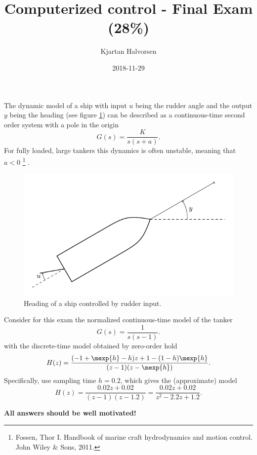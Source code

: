 \documentclass[a4paper]{scrartcl}
\author{Kjartan Halvorsen}
\date{2018-11-29}
\title{Computerized control - Final Exam (28\%)}
\begin{document}
\maketitle
The dynamic model of a ship with input $u$ being the rudder angle and the output $y$ being the heading (see figure \ref{fig:tanker}) can be described as a continuous-time second order system with a pole in the origin
\[ G(s) = \frac{K}{s(s + a)}. \]
For fully loaded, large tankers this dynamics is often unstable, meaning that $a<0$ \footnote{Fossen, Thor I. Handbook of marine craft hydrodynamics and motion control. John Wiley \& Sons, 2011.} .  
\begin{figure}[h]
\begin{center}
\includegraphics[]{tanker}
\caption{Heading of a ship controlled by rudder input.}
\label{fig:tanker}
\end{center}
\end{figure}

Consider for this exam the normalized continuous-time model of the tanker
\[ G(s) = \frac{1}{s(s - 1)}. \]
with the discrete-time model obtained by zero-order hold
\begin{equation*}
 H(z) = \frac{(-1+\mexp{h} -h)z + 1 - (1-h)\mexp{h}}{(z-1)(z-\mexp{h})}.
\end{equation*}
Specifically, use sampling time $h=0.2$, which gives the (approximate) model
\begin{equation}
 H(z) = \frac{0.02z + 0.02}{(z-1)(z-1.2)} = \frac{0.02z + 0.02}{z^2-2.2z+1.2}.
\label{eq:model}
\end{equation}

\textbf{All answers should be well motivated!}
\end{document}
